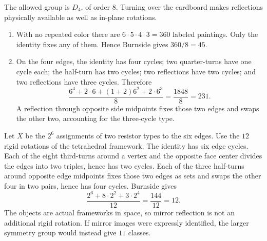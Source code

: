 The allowed group is $D_4$, of order $8$. Turning over the cardboard makes
reflections physically available as well as in-plane rotations.
\begin{enumerate}[label=(\alph*)]
\item With no repeated color there are $6\cdot5\cdot4\cdot3=360$ labeled
paintings. Only the identity fixes any of them. Hence Burnside gives
$360/8=\boxed{45}$.
\item On the four edges, the identity has four cycles; two quarter-turns
have one cycle each; the half-turn has two cycles; two reflections have
two cycles; and two reflections have three cycles. Therefore
\[
\frac{6^4+2\cdot6+(1+2)6^2+2\cdot6^3}{8}
=\frac{1848}{8}=\boxed{231}.
\]
A reflection through opposite side midpoints fixes those two edges and
swaps the other two, accounting for the three-cycle type.
\end{enumerate}

Let $X$ be the $2^6$ assignments of two resistor types to the six edges.
Use the $12$ rigid rotations of the tetrahedral framework. The identity
has six edge cycles. Each of the eight third-turns around a vertex and
the opposite face center divides the edges into two triples, hence has
two cycles. Each of the three half-turns around opposite edge midpoints
fixes those two edges as sets and swaps the other four in two pairs,
hence has four cycles. Burnside gives
\[
\frac{2^6+8\cdot2^2+3\cdot2^4}{12}
=\frac{144}{12}=\boxed{12}.
\]
The objects are actual frameworks in space, so mirror reflection is not
an additional rigid rotation. If mirror images were expressly identified,
the larger symmetry group would instead give $11$ classes.

